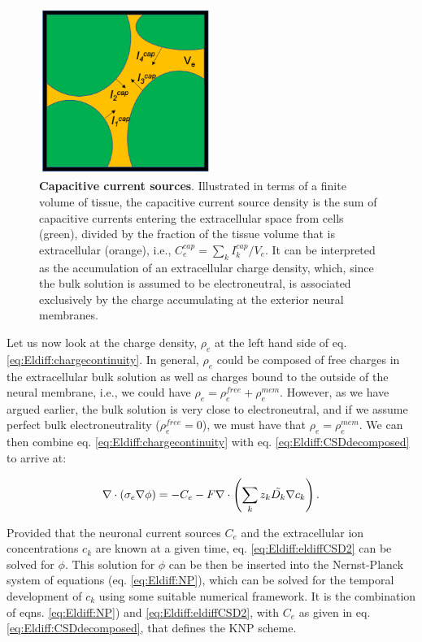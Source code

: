 \begin{figure}[!ht]
\begin{center}
\includegraphics[width=0.5\textwidth]{Figures/Eldiff/KNP_Cap_illustration.png}
\end{center}
\caption{\textbf{Capacitive current sources}. Illustrated in terms of a finite volume of tissue, the capacitive current source density is the sum of capacitive currents entering the extracellular space from cells (green), divided by the fraction of the tissue volume that is extracellular (orange), i.e., $C_e^{cap} = \sum_k I_k^{cap}/V_e$. It can be interpreted as the accumulation of an extracellular charge density, which, since the bulk solution is assumed to be electroneutral, is associated exclusively by the charge accumulating at the exterior neural membranes.}
\label{Eldiff:fig:Ccap}
\end{figure}

Let us now look at the charge density, $\rho_e$ at the left hand side of eq. \ref{eq:Eldiff:chargecontinuity}. In general, $\rho_e$ could be composed of free charges in the extracellular bulk solution as well as charges bound to the outside of the neural membrane, i.e., we could have $\rho_e = \rho_e^{free} + \rho_e^{mem}$. However, as we have argued earlier, the bulk solution is very close to electroneutral, and if we assume perfect bulk electroneutrality ($\rho_e^{free} = 0$), we must have that $\rho_e=\rho_e^{mem}$. We can then combine eq. \ref{eq:Eldiff:chargecontinuity} with eq. \ref{eq:Eldiff:CSDdecomposed} to arrive at:

\begin{equation}
\nabla \cdot (\sigma_e\nabla\phi) = - C_e - F \nabla \cdot \left (\sum_k{z_k \tilde{D_k}{\bf \nabla} c_{k}} \right).
\label{eq:Eldiff:eldiffCSD2}
\end{equation}

Provided that the neuronal current sources $C_e$ and the extracellular ion concentrations $c_k$ are known at a given time, eq. \ref{eq:Eldiff:eldiffCSD2} can be solved for $\phi$. This solution for $\phi$ can be then be inserted into the Nernst-Planck system of equations (eq. \ref{eq:Eldiff:NP}), 
which can be solved for the temporal development of $c_k$ using some suitable numerical framework. It is the combination of eqns. \ref{eq:Eldiff:NP}) and \ref{eq:Eldiff:eldiffCSD2}, with $C_e$ as given in eq. \ref{eq:Eldiff:CSDdecomposed}, that defines the KNP scheme. 



